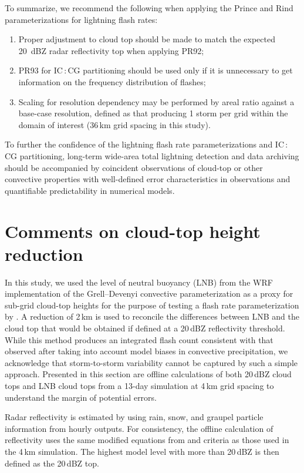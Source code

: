 To summarize, we recommend the following when applying the Prince and Rind
parameterizations for lightning flash rates:
\begin{enumerate}
\item Proper adjustment to cloud top should be made to match the expected 20~\unit{dBZ} radar reflectivity top when applying PR92;
 \item PR93 for IC\,:\,CG partitioning should be used only if it is unnecessary to get information on the frequency distribution of flashes;
  \item Scaling for resolution dependency may be performed by areal ratio against a base-case resolution, defined as that producing 1 storm per grid within the domain of interest (36\,\unit{km} grid spacing in this study).
  \end{enumerate}

To further the confidence of the lightning flash rate parameterizations and
IC\,:\,CG partitioning, long-term wide-area total lightning detection and
data archiving should be accompanied by coincident observations of cloud-top
or other convective properties with well-defined error characteristics in
observations and quantifiable predictability in numerical models.

\section{Comments on cloud-top height reduction} \label{apdx:lightning/ktop}

In this study, we used the level of neutral buoyancy (LNB) from the WRF
implementation of the Grell--Devenyi convective parameterization
\citep{Grell:2002bs} as a proxy for sub-grid cloud-top heights for the
purpose of testing a flash rate parameterization by
\citet{Price:1992wb,Price:1993fk,Price:1994fk}. A reduction of 2\,\unit{km}
is used to reconcile the differences between LNB and the cloud top that would
be obtained if defined at a 20\,\unit{dBZ} reflectivity threshold.
While this method produces an integrated flash count consistent with that
observed after taking into account model biases in convective precipitation,
we acknowledge that storm-to-storm variability cannot be captured by such a
simple \mbox{approach}. Presented in this section are offline calculations of both
20\,\unit{dBZ} cloud tops and LNB cloud tops from a 13-day simulation at
4\,\unit{km} grid spacing to understand the margin of potential errors.

Radar reflectivity is estimated by using rain, snow, and graupel particle
information from hourly outputs. For consistency, the offline calculation of
reflectivity uses the same modified equations from \citet{Smith:1975fk} and
criteria as those used in the 4\,\unit{km} simulation. The highest model
level with more than 20\,\unit{dBZ} is then defined as the 20\,\unit{dBZ}
top.

